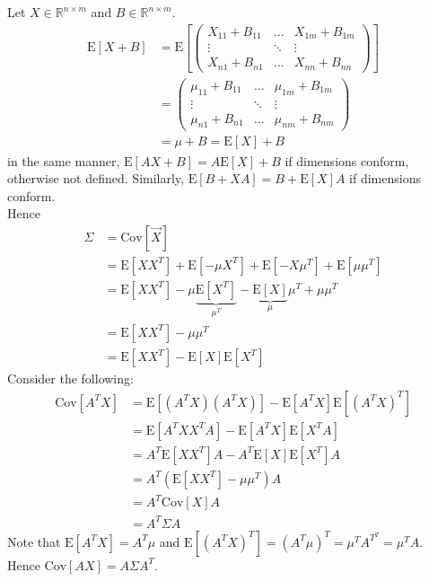 \documentclass[12pt]{article}
\newcommand{\expected}[1]{\mathrm{E}[#1]}
\newcommand{\covariance}[1]{\mathrm{Cov}[#1]}
\begin{document}
Let $X \in \mathbb{R}^{n \times m}$ and $B \in \mathbb{R}^{n \times m}$. 
$$ \begin{aligned} \expected{X + B} &= \expected{\begin{pmatrix} X_{11} + B_{11} & \dots & X_{1m} + B_{1m} \\ \vdots & \ddots & \vdots \\ X_{n1} + B_{n1} & \dots & X_{nn} + B_{nn} \end{pmatrix}} \\ &= \begin{pmatrix} \mu_{11} + B_{11} & \dots & \mu_{1m} + B_{1m} \\ \vdots & \ddots & \vdots \\ \mu_{n1} + B_{n1} & \dots & \mu_{nm} + B_{nm} \end{pmatrix} \\ &= \mu + B = \expected{X} + B \end{aligned} $$ 
in the same manner, $\expected{AX + B} = A\expected{X} + B$ if dimensions conform, otherwise not defined. Similarly, $\expected{B + XA} = B + \expected{X}A$ if dimensions conform. \\ Hence
$$ \begin{aligned} 
\Sigma &= \covariance{\vec{X}} \\ &= \expected{XX^T} + \expected{-\mu X^T} + \expected{-X\mu^T} + \expected{\mu \mu^T} \\ &= \expected{XX^T} - \mu\underbrace{\expected{X^T}}_{\mu^T} - \underbrace{\expected{X}}_{\mu}\mu^T + \mu \mu^T \\ &= \expected{XX^T} - \mu \mu^T \\ &= \expected{XX^T} - \expected{X}\expected{X^T} \end{aligned} $$ 
Consider the following: $$ \begin{aligned} 
\covariance{A^TX} &= \expected{(A^TX)(A^TX)} - \expected{A^TX}\expected{(A^TX)^T} \\ &= \expected{A^TXX^TA} - \expected{A^TX}\expected{X^TA} \\ &= A^T\expected{XX^T}A - A^T\expected{X}\expected{X^T}A \\ &= A^T(\expected{XX^T} - \mu \mu^T)A \\ &= A^T\covariance{X}A \\ &= A^T\Sigma A \end{aligned} $$ 
Note that $\expected{A^TX} = A^T\mu$ and $\expected{(A^TX)^T} = (A^T\mu)^T = \mu^T A^{T^T} = \mu^T A$. \\
Hence $\covariance{AX} = A\Sigma A^T$. \\~\\
\end{document}
